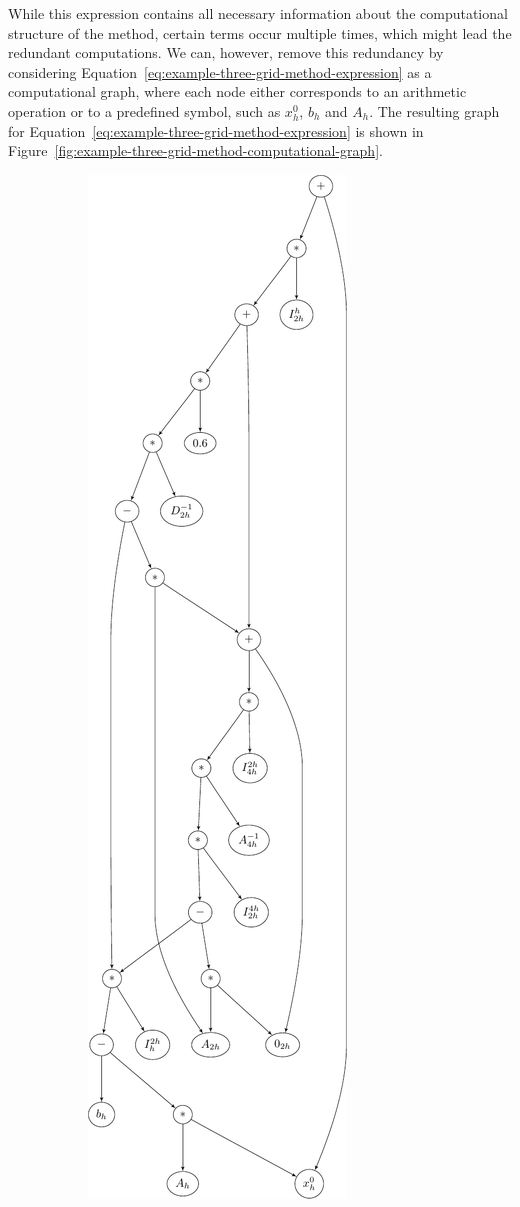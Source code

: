 While this expression contains all necessary information about the computational structure of the method, certain terms occur multiple times, which might lead the redundant computations.
We can, however, remove this redundancy by considering Equation~\eqref{eq:example-three-grid-method-expression} as a computational graph, where each node either corresponds to an arithmetic operation or to a predefined symbol, such as $x^0_h$, $b_h$ and $A_h$.
The resulting graph for Equation~\eqref{eq:example-three-grid-method-expression} is shown in Figure~\ref{fig:example-three-grid-method-computational-graph}.
\begin{figure}
	\centering
	\begin{subfigure}[b]{0.49\textwidth}
		\includegraphics[scale=0.5]{figures/trees/three_grid_method_computational_graph.pdf}

\end{subfigure}
\end{figure}
